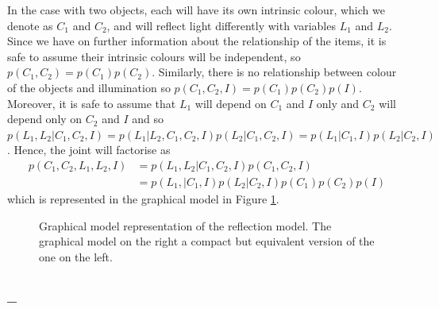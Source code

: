 \documentclass[a4paper]{article}
\newcommand{\questionref}[1]{\Cref{#1} -- \nameref{#1}}
\theoremstyle{definition}
\begin{document}
In the case with two objects, each will have its own intrinsic colour, which we denote as $C_1$ and $C_2$, and will reflect light differently with variables $L_1$ and $L_2$. Since we have on further information about the relationship of the items, it is safe to assume their intrinsic colours will be independent, so $p(C_1, C_2) = p(C_1) p(C_2)$. Similarly, there is no relationship between colour of the objects and illumination so $p(C_1, C_2, I) = p(C_1) p(C_2) p(I)$. Moreover, it is safe to assume that $L_1$ will depend on $C_1$ and $I$ only and $C_2$ will depend only on $C_2$ and $I$ and so $p(L_1, L_2|C_1, C_2, I)=p(L_1|  L_2, C_1, C_2, I) p(L_2| C_1, C_2, I)=p(L_1|  C_1, I) p(L_2| C_2, I)$. Hence, the joint will factorise as
\begin{align}
p(C_1, C_2,  L_1, L_2, I) &= p(L_1, L_2|C_1, C_2, I) p(C_1, C_2, I) \\
&= p(L_1, |C_1, I) p(L_2| C_2, I) p(C_1) p(C_2) p(I)
\end{align}
which is represented in the graphical model in Figure \ref{fig:gm-reflection}.
\begin{figure}[h]
\centering
{}
\hspace{3.0cm}
\caption{Graphical model representation of the reflection model. The graphical model on the right a compact but equivalent version of the one on the left.}
\label{fig:gm-reflection}
\end{figure}



\subsection{\questionref{q:gm-filtering}}
\end{document}
